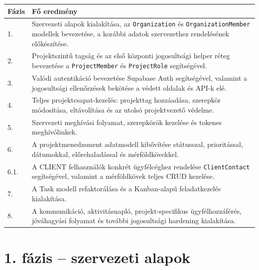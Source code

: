 \documentclass[11pt,a4paper]{report}
\begin{document}
    \begin{longtable}{p{}p{}}
        \toprule
        \textbf{Fázis} & \textbf{Fő eredmény} \\
        \midrule
        \endhead

        1. &
        Szervezeti alapok kialakítása, az \texttt{Organization} és
        \texttt{OrganizationMember} modellek bevezetése, a korábbi adatok
        szervezethez rendelésének előkészítése. \\

        2. &
        Projektszintű tagság és az első központi jogosultsági helper réteg
        bevezetése a \texttt{ProjectMember} és \texttt{ProjectRole} segítségével. \\

        3. &
        Valódi autentikáció bevezetése Supabase Auth segítségével, valamint a
        jogosultsági ellenőrzések bekötése a védett oldalak és API-k elé. \\

        4. &
        Teljes projektcsapat-kezelés: projekttag hozzáadása, szerepkör módosítása,
        eltávolítása és az utolsó projektvezető védelme. \\

        5. &
        Szervezeti meghívási folyamat, szerepkörök kezelése és tokenes
        meghívólinkek. \\

        6. &
        A projektmenedzsment adatmodell kibővítése státusszal, prioritással,
        dátumokkal, előrehaladással és mérföldkövekkel. \\

        6.1. &
        A CLIENT felhasználók konkrét ügyfélcéghez rendelése
        \texttt{ClientContact} segítségével, valamint a mérföldkövek teljes CRUD
        kezelése. \\

        7. &
        A Task modell refaktorálása és a Kanban-alapú feladatkezelés
        kialakítása. \\

        8. &
        A kommunikáció, aktivitásnapló, projekt-specifikus ügyfélhozzáférés,
        jóváhagyási folyamat és további jogosultsági hardening kialakítása. \\

        \bottomrule
    \end{longtable}

    \section{1. fázis -- szervezeti alapok}
\end{document}
